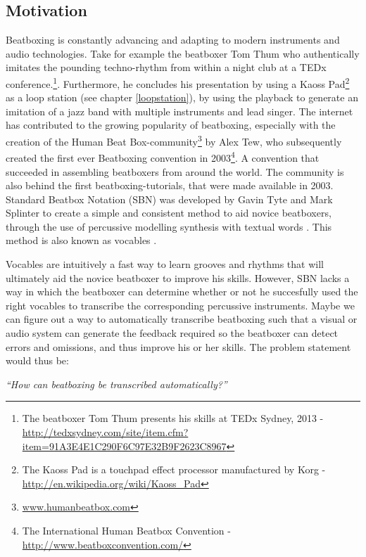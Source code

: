 \subsection{ Motivation }
Beatboxing is constantly advancing and adapting to modern instruments and audio technologies. Take for example the beatboxer Tom Thum who authentically imitates the pounding techno-rhythm from within a night club at a TEDx conference.\footnote{The beatboxer Tom Thum presents his skills at TEDx Sydney, 2013 - \url{http://tedxsydney.com/site/item.cfm?item=91A3E4E1C290F6C97E32B9F2623C8967}}. Furthermore, he concludes his presentation by using a Kaoss Pad\footnote{The Kaoss Pad is a touchpad effect processor manufactured by Korg - \url{http://en.wikipedia.org/wiki/Kaoss_Pad}} as a loop station (see chapter \ref{loopstation}), by using the playback to generate an imitation of a jazz band with multiple instruments and lead singer. The internet has contributed to the growing popularity of beatboxing, especially with the creation of the Human Beat Box-community\footnote{\url{www.humanbeatbox.com}} by Alex Tew, who subsequently created the first ever Beatboxing convention in 2003\footnote{The International Human Beatbox Convention - \url{http://www.beatboxconvention.com/}}. A convention that succeeded in assembling beatboxers from around the world. The community is also behind the first beatboxing-tutorials, that were made available in 2003. Standard Beatbox Notation (SBN) was developed by Gavin Tyte and Mark Splinter to create a simple and consistent method to aid novice beatboxers\citep{tyte2005}, through the use of percussive modelling synthesis with textual words \citep{McLean2009}. This method is also known as vocables \citep{McLean2009}.

Vocables are intuitively a fast way to learn grooves and rhythms that will ultimately aid the novice beatboxer to improve his skills. However, SBN lacks a way in which the beatboxer can determine whether or not he succesfully used the right vocables to transcribe the corresponding percussive instruments. Maybe we can figure out a way to automatically transcribe beatboxing such that a visual or audio system can  generate  the feedback required so the beatboxer can detect errors and omissions, and thus improve his or her skills. The problem statement would thus be:\\
\begin{center}
\textit{“How can beatboxing be transcribed automatically?”}
\end{center}
